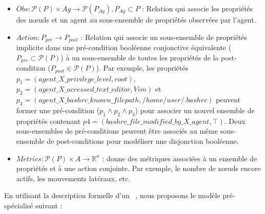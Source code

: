 \begin{itemize}
    \item $Obs : \mathcal{P}(P) \times Ag \rightarrow \mathcal{P}(P_{Ag}), P_{Ag} \subset P$ : Relation qui associe les propriétés des nœuds et un agent au sous-ensemble de propriétés observées par l'agent.



    \item $Action : P_{pre} \rightarrow P_{post}$ : Relation qui associe un sous-ensemble de propriétés implicite dans une pré-condition booléenne conjonctive équivalente ($P_{pre} \subset \mathcal{P}(P)$) à un sous-ensemble de toutes les propriétés de la post-condition ($P_{post} \in \mathcal{P}(P)$). Par exemple, les propriétés $p_1 = (agent\_X\_privilege\_level, \allowbreak root)$, $p_2 = (agent\_X\_accessed\_text\_editor, \allowbreak Vim)$ et $p_3 = (agent\_X\_bashrc\_known\_filepath, \allowbreak /home/user/.bashrc)$ peuvent former une pré-condition ($p_1 \land p_2 \land p_3$) pour associer un nouvel ensemble de propriétés contenant $p4 = (bashrc\_file\_modified\_by\_X\_agent, \top)$. Deux sous-ensembles de pré-conditions peuvent être associés au même sous-ensemble de post-conditions pour modéliser une disjonction booléenne.

    \item $Metrics: \mathcal{P}(P) \times A \rightarrow \mathbb{R}^{n}$ : donne des métriques associées à un ensemble de propriétés et à une action conjointe. Par exemple, le nombre de nœuds encore actifs, les mouvements latéraux, etc.

\end{itemize}


En utilisant la description formelle d'un ~\cite{Oliehoek2016}, nous proposons le modèle  pré-spécialisé suivant :

